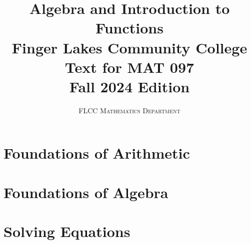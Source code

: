 \documentclass[a4paper,12pt]{book}
\title{\textbf{\huge{Algebra and Introduction to Functions}} \\ Finger Lakes Community College \\ Text for MAT 097 \\ Fall 2024 Edition}
\author{\textsc{FLCC Mathematics Department}}
\theoremstyle{definition}
\begin{document}
\frontmatter

\tableofcontents
{}
\mainmatter


%
%

\chapter{Foundations of Arithmetic}
\clearpage




\renewcommand{\thesection}{\arabic{chapter}.R}

\renewcommand{\thesection}{\arabic{chapter}.\arabic{section}}

%
%

\chapter{Foundations of Algebra}
\clearpage







\renewcommand{\thesection}{\arabic{chapter}.R}

\renewcommand{\thesection}{\arabic{chapter}.\arabic{section}}

%
%

\chapter{Solving Equations}
\clearpage
\end{document}
